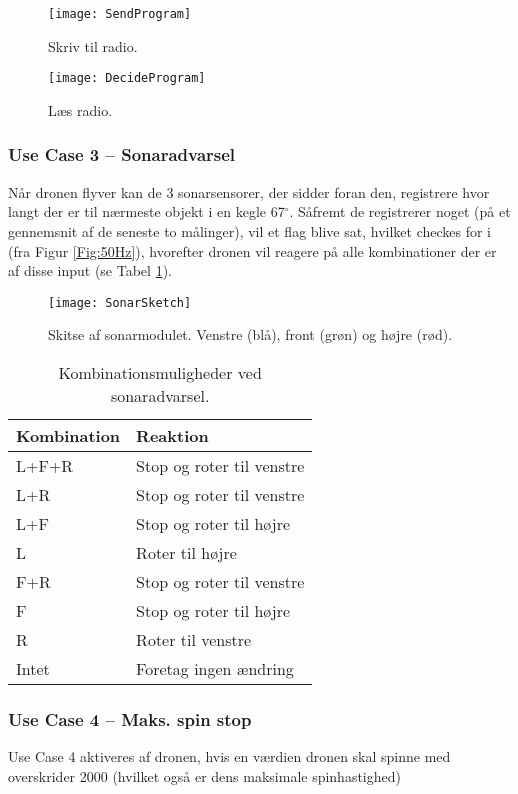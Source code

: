 \documentclass[Main]{subfiles}
\begin{document}
\begin{figure}[H]
\centering
\texttt{[image: SendProgram]}
\caption{Skriv til radio.}
\label{Fig:SendProgram}
\end{figure}


\begin{figure}[H]
\centering
\texttt{[image: DecideProgram]}
\caption{Læs radio.}
\label{Fig:DecideProgram}
\end{figure}


\newpage
\subsubsection{Use Case 3 -- Sonaradvarsel}
Når dronen flyver kan de 3 sonarsensorer, der sidder foran den, registrere hvor langt der er til nærmeste objekt i en kegle 67$^{\circ}$.
Såfremt de registrerer noget (på et gennemsnit af de seneste to målinger), vil et flag blive sat, hvilket checkes for i  (fra Figur \ref{Fig:50Hz}), hvorefter dronen vil reagere på alle kombinationer der er af disse input (se Tabel \ref{Tab:SonarAdvarsel}).


\begin{figure}[H]
\centering
\texttt{[image: SonarSketch]}
\caption{Skitse af sonarmodulet. Venstre (blå), front (grøn) og højre (rød).}
\label{Fig:SonarSketch}
\end{figure}

\begin{table}[H]
\centering
	\begin{tabular}{l l}
	\hline Kombination & Reaktion
	\\ \hline 
	L+F+R & Stop og roter til venstre \\
	L+R & Stop og roter til venstre\\
	L+F & Stop og roter til højre\\
	L & Roter til højre\\
	F+R & Stop og roter til venstre\\
	F & Stop og roter til højre\\
	R & Roter til venstre\\
	Intet & Foretag ingen ændring \\ \hline
	\end{tabular}
\caption{Kombinationsmuligheder ved sonaradvarsel.}
\label{Tab:SonarAdvarsel}
\end{table}

\subsubsection{Use Case 4 -- Maks. spin stop}
Use Case 4 aktiveres af dronen, hvis en værdien dronen skal spinne med overskrider 2000 (hvilket også er dens maksimale spinhastighed)
\end{document}
